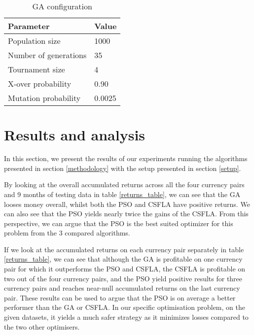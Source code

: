 \documentclass[conference]{IEEEtran}
\begin{document}
\begin{table}[htbp]
\caption{GA configuration}\label{ga_config}
\centering
\begin{tabular}{|l|l|}
\hline
Parameter                           & Value   \\ \hline
Population size                     & 1000      \\
Number of generations               & 35     \\
Tournament size                     & 4    \\
X-over probability                  & 0.90    \\
Mutation probability                & 0.0025    \\ \hline
\end{tabular}
\end{table}

\section{Results and analysis}\label{results}
In this section, we present the results of our experiments running the algorithms presented in section \ref{methodology} with the setup presented in section \ref{setup}. 

By looking at the overall accumulated returns across all the four currency pairs and 9 months of testing data in table \ref{returns_table}, we can see that the GA looses money overall, whilst both the PSO and CSFLA have positive returns. We can also see that the PSO yields nearly twice the gains of the CSFLA. From this perspective, we can argue that the PSO is the best suited optimizer for this problem from the 3 compared algorithms.

If we look at the accumulated returns on each currency pair separately in table \ref{returns_table}, we can see that although the GA is profitable on one currency pair for which it outperforms the PSO and CSFLA, the CSFLA is profitable on two out of the four currency pairs, and the PSO yield positive results for three currency pairs and reaches near-null accumulated returns on the last currency pair. These results can be used to argue that the PSO is on average a better performer than the GA or CSFLA. In our specific optimisation problem, on the given datasets, it yields a much safer strategy as it minimizes losses compared to the two other optimisers.
\end{document}
